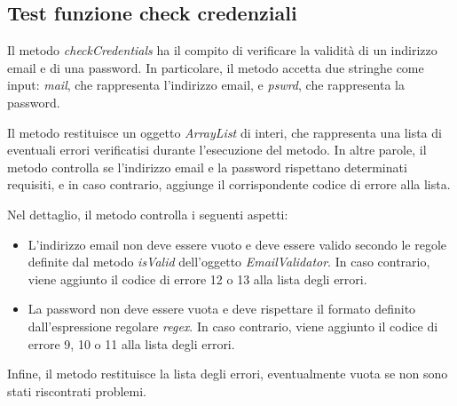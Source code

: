 \subsection{Test funzione check credenziali}
\begin{flushleft}
    
    Il metodo \textit{checkCredentials} ha il compito di verificare la validità di un indirizzo email e di una password. In particolare, il metodo accetta due stringhe come input: \textit{mail}, che rappresenta l'indirizzo email, e \textit{pswrd}, che rappresenta la password.

    Il metodo restituisce un oggetto \textit{ArrayList} di interi, che rappresenta una lista di eventuali errori verificatisi durante l'esecuzione del metodo. In altre parole, il metodo controlla se l'indirizzo email e la password rispettano determinati requisiti, e in caso contrario, aggiunge il corrispondente codice di errore alla lista.
    
    Nel dettaglio, il metodo controlla i seguenti aspetti:
    
    \begin{itemize}
    \item L'indirizzo email non deve essere vuoto e deve essere valido secondo le regole definite dal metodo \textit{isValid} dell'oggetto \textit{EmailValidator}. In caso contrario, viene aggiunto il codice di errore 12 o 13 alla lista degli errori.
    \item La password non deve essere vuota e deve rispettare il formato definito dall'espressione regolare \textit{regex}. In caso contrario, viene aggiunto il codice di errore 9, 10 o 11 alla lista degli errori.
    \end{itemize}
    
    Infine, il metodo restituisce la lista degli errori, eventualmente vuota se non sono stati riscontrati problemi.\\
\end{flushleft}

\vspace{0.2cm}

